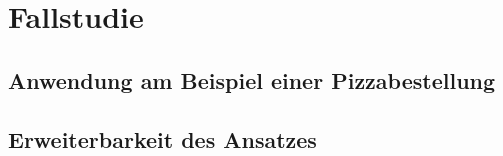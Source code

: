 \chapter{Fallstudie}

\section{Anwendung am Beispiel einer Pizzabestellung}

\section{Erweiterbarkeit des Ansatzes}
